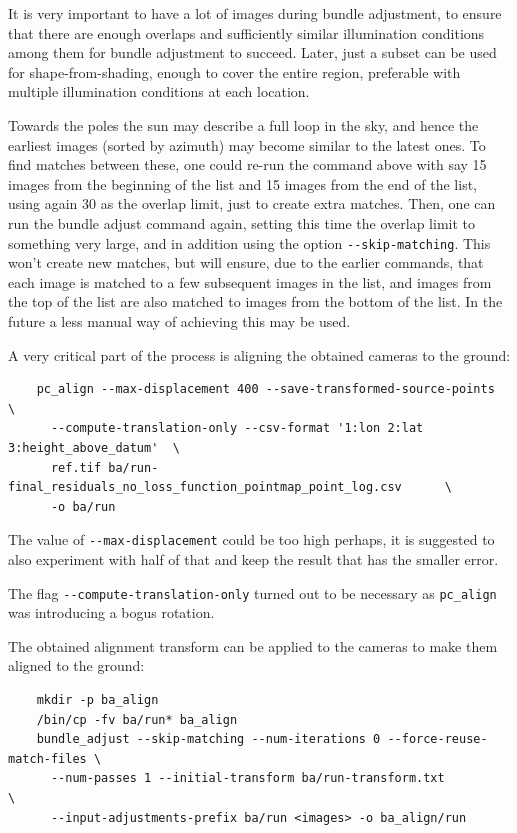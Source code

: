 It is very important to have a lot of images during bundle adjustment,
to ensure that there are enough overlaps and sufficiently similar
illumination conditions among them for bundle adjustment to
succeed. Later, just a subset can be used for shape-from-shading, enough
to cover the entire region, preferable with multiple illumination
conditions at each location.

Towards the poles the sun may describe a full loop in the sky, and hence
the earliest images (sorted by azimuth) may become similar to the latest
ones. To find matches between these, one could re-run the command above
with say 15 images from the beginning of the list and 15 images from the
end of the list, using again 30 as the overlap limit, just to create
extra matches. Then, one can run the bundle adjust command again,
setting this time the overlap limit to something very large, and in
addition using the option \texttt{-\/-skip-matching}. This won't create
new matches, but will ensure, due to the earlier commands, that each
image is matched to a few subsequent images in the list, and images from
the top of the list are also matched to images from the bottom of the
list. In the future a less manual way of achieving this may be used.

A very critical part of the process is aligning the obtained cameras to the ground:

\begin{verbatim}
    pc_align --max-displacement 400 --save-transformed-source-points              \
      --compute-translation-only --csv-format '1:lon 2:lat 3:height_above_datum'  \
      ref.tif ba/run-final_residuals_no_loss_function_pointmap_point_log.csv      \
      -o ba/run 
\end{verbatim}

The value of \texttt{-\/-max-displacement} could be too high perhaps, it
is suggested to also experiment with half of that and keep the result
that has the smaller error.

The flag \texttt{-\/-compute-translation-only} turned out to be
necessary as \texttt{pc\_align} was introducing a bogus rotation. 

The obtained alignment transform can be applied to the cameras to make them aligned
to the ground:

\begin{verbatim}
    mkdir -p ba_align
    /bin/cp -fv ba/run* ba_align
    bundle_adjust --skip-matching --num-iterations 0 --force-reuse-match-files \
      --num-passes 1 --initial-transform ba/run-transform.txt                  \
      --input-adjustments-prefix ba/run <images> -o ba_align/run
\end{verbatim}

